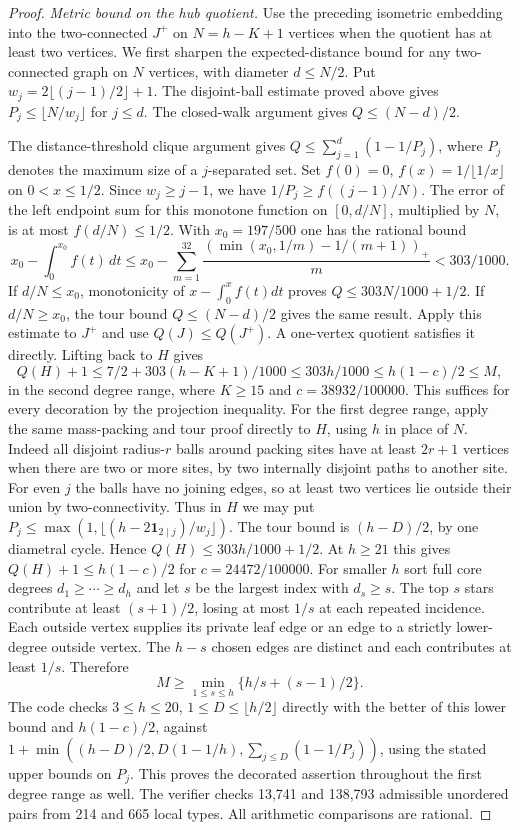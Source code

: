 \documentclass[11pt,a4paper]{article}
\begin{document}
\begin{proof}
\emph{Metric bound on the hub quotient.}
Use the preceding isometric embedding into the two-connected $J^+$ on $N=h-K+1$ vertices when the quotient has at least two vertices. We first sharpen the expected-distance bound for any two-connected graph on $N$ vertices, with diameter $d\le N/2$. Put $w_j=2\lfloor(j-1)/2\rfloor+1$. The disjoint-ball estimate proved above gives $P_j\le\lfloor N/w_j\rfloor$ for $j\le d$. The closed-walk argument gives $Q\le(N-d)/2$.

The distance-threshold clique argument gives $Q\le\sum_{j=1}^d (1-1/P_j)$, where $P_j$ denotes the maximum size of a $j$-separated set. Set $f(0)=0$, $f(x)=1/\lfloor1/x\rfloor$ on $0<x\le1/2$. Since $w_j\ge j-1$, we have $1/P_j\ge f((j-1)/N)$. The error of the left endpoint sum for this monotone function on $[0,d/N]$, multiplied by $N$, is at most $f(d/N)\le1/2$. With $x_0=197/500$ one has the rational bound
\[
 x_0-\int_0^{x_0} f(t)\,dt
 \le x_0-\sum_{m=1}^{32}
 \frac{(\min(x_0,1/m)-1/(m+1))_+}{m}<303/1000.
\]
If $d/N\le x_0$, monotonicity of $x-\int_0^x f(t)dt$ proves $Q\le303N/1000+1/2$. If $d/N\ge x_0$, the tour bound $Q\le(N-d)/2$ gives the same result. Apply this estimate to $J^+$ and use $Q(J)\le Q(J^+)$. A one-vertex quotient satisfies it directly. Lifting back to $H$ gives
\[
 Q(H)+1\le 7/2+303(h-K+1)/1000\le 303h/1000
 \le h(1-c)/2\le M,
\]
in the second degree range, where $K\ge15$ and $c=38932/100000$. This suffices for every decoration by the projection inequality. For the first degree range, apply the same mass-packing and tour proof directly to $H$, using $h$ in place of $N$. Indeed all disjoint radius-$r$ balls around packing sites have at least $2r+1$ vertices when there are two or more sites, by two internally disjoint paths to another site. For even $j$ the balls have no joining edges, so at least two vertices lie outside their union by two-connectivity. Thus in $H$ we may put 
$P_j\le \max(1,\lfloor(h-2\mathbf1_{2\mid j})/w_j\rfloor)$.
The tour bound is $(h-D)/2$, by one diametral cycle. Hence $Q(H)\le303h/1000+1/2$. At $h\ge21$ this gives $Q(H)+1\le h(1-c)/2$ for $c=24472/100000$. For smaller $h$ sort full core degrees $d_1\ge\cdots\ge d_h$ and let $s$ be the largest index with $d_s\ge s$. The top $s$ stars contribute at least $(s+1)/2$, losing at most $1/s$ at each repeated incidence. Each outside vertex supplies its private leaf edge or an edge to a strictly lower-degree outside vertex. The $h-s$ chosen edges are distinct and each contributes at least $1/s$. Therefore
\[
 M\ge \min_{1\le s\le h}\{h/s+(s-1)/2\}.
\]
The code checks $3\le h\le20$, $1\le D\le\lfloor h/2\rfloor$ directly with the better of this lower bound and $h(1-c)/2$, against $1+\min((h-D)/2,D(1-1/h),\sum_{j\le D}(1-1/P_j))$, using the stated upper bounds on $P_j$. This proves the decorated assertion throughout the first degree range as well.
The verifier checks 13,741 and 138,793 admissible unordered pairs from 214 and 665 local types. All arithmetic comparisons are rational.
\end{proof}
\end{document}
